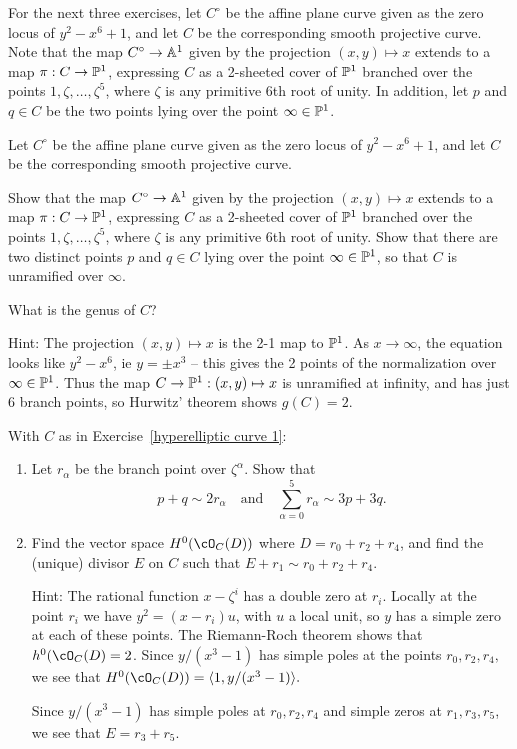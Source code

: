 For the next three exercises, let $C^\circ$ be the affine plane curve given as the zero locus of $y^2 - x^6 +1$, and let $C$ be the corresponding smooth projective curve. Note that the map $C^\circ \to \AA^1$ given by the projection $(x,y) \mapsto x$ extends to a map $\pi : C \to \PP^1$, expressing $C$ as a 2-sheeted cover of $\PP^1$ branched over the points $1, \zeta, \dots, \zeta^5$, where $\zeta$ is any primitive 6th root of unity. In addition, let $p$ and $q \in C$ be the two points lying over the point $\infty \in \PP^1$.

\begin{exercise}\label{hyperelliptic curve 1}
Let $C^\circ$ be the affine plane curve given as the zero locus of $y^2 - x^6 +1$, and let $C$ be the corresponding smooth projective curve. 

Show  that the map $C^\circ \to \AA^1$ given by the projection $(x,y) \mapsto x$ extends to a map $\pi : C \to \PP^1$, expressing $C$ as a 2-sheeted cover of $\PP^1$ branched over the points $1, \zeta, \dots, \zeta^5$, where $\zeta$ is any primitive 6th root of unity. Show that there are two distinct points $p$ and $q \in C$  lying over the point $\infty \in \PP^1$,
so that $C$ is unramified over $\infty$.

What is the genus of $C$?

Hint: The projection $(x,y) \mapsto x$ is the 2-1 map to $\PP^1$. As $x\to \infty$, the equation looks like $y^2-x^6$, ie $y= \pm x^3$ -- this gives the 2 points of the normalization over $\infty\in \PP^1$. Thus the map $C\to \PP^1: (x,y) \mapsto x$
is unramified at infinity, and has just 6 branch points, so Hurwitz' theorem shows $g(C) = 2$.

\end{exercise}

\begin{exercise} With $C$ as in Exercise~\ref{hyperelliptic curve 1}:
\begin{enumerate}

\item Let $r_\alpha$ be the branch point over $\zeta^\alpha$. Show that
$$
p+q \sim 2r_\alpha \quad \text{and} \quad \sum_{\alpha = 0}^5 r_\alpha \sim 3p+3q.
$$

\item Find the vector space $H^0(\cO_C(D))$ where $D = r_0 + r_2 + r_4$, and find the (unique) divisor $E$ on $C$ such that $E + r_1 \sim r_0 + r_2 + r_4$.

Hint: The rational function $x-\zeta^i$ has a double zero at $r_i$. Locally at the point $r_i$ we have $y^2 = (x-r_i)u$,
with $u$ a local unit, so $y$ has a simple zero at each of these points. The Riemann-Roch theorem shows that $h^0(\cO_C(D) = 2$. Since $y/(x^3-1)$ has simple poles at the points $r_0,r_2,r_4,$ we see that $H^0(\cO_C(D)) = \langle1, y/(x^3-1)\rangle.$ 

Since $y/(x^3-1)$ has simple poles at $r_0,r_2,r_4$ and simple zeros at $r_1,r_3,r_5$, we see that $E = r_3+r_5$.
\end{enumerate}

\end{exercise}


